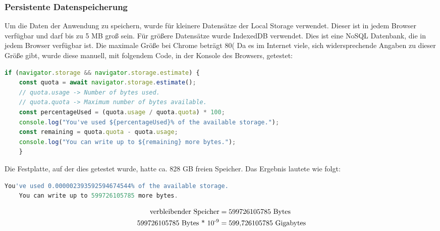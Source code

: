 \subsubsection{Persistente Datenspeicherung}
Um die Daten der Anwendung zu speichern, wurde für kleinere Datensätze der Local Storage verwendet.
Dieser ist in jedem Browser verfügbar und darf bis zu 5 MB groß sein.
\newline
\newline
Für größere Datensätze wurde IndexedDB verwendet.
Dies ist eine NoSQL Datenbank, die in jedem Browser verfügbar ist.
Die maximale Größe bei Chrome beträgt 80(%
Da es im Internet viele, sich widersprechende Angaben zu dieser Größe gibt, wurde diese manuell, mit folgendem Code, in der Konsole des Browsers, getestet:
\newline
\newline
\begin{lstlisting}[language=javascript,label={lst:JavaScript IndexedDB Speichergröße}]
    if (navigator.storage && navigator.storage.estimate) {
    const quota = await navigator.storage.estimate();
    // quota.usage -> Number of bytes used.
    // quota.quota -> Maximum number of bytes available.
    const percentageUsed = (quota.usage / quota.quota) * 100;
    console.log("You've used ${percentageUsed}% of the available storage.");
    const remaining = quota.quota - quota.usage;
    console.log("You can write up to ${remaining} more bytes.");
    }
\end{lstlisting}
\newline
\newline
Die Festplatte, auf der dies getestet wurde, hatte ca. 828 GB freien Speicher.
Das Ergebnis lautete wie folgt:
\newline
\newline
\begin{lstlisting}[language=javascript,label={lst:JavaScript IndexedDB Speichergröße Ergebnis}]
    You've used 0.000002393592594674544% of the available storage.
    You can write up to 599726105785 more bytes.
\end{lstlisting}
\newline
\newline
\begin{equation}
    \begin{aligned}
       \text{verbleibender Speicher} &= \text{599726105785 Bytes}\\
       \newline
       \text{599726105785 Bytes} \text{ * 10}\textsuperscript{-9} &= \text{599,726105785 Gigabytes}\\
        \newline
        \newline
    \end{aligned}
\end{equation}
